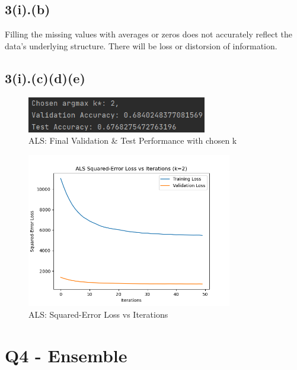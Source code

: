 \documentclass{article}
\begin{document}
\subsection*{3(i).(b)}
Filling the missing values with averages or zeros does not accurately reflect the data's underlying structure. There will be loss or distorsion of information.

\subsection*{3(i).(c)(d)(e)}
\begin{figure}[H]
    \centering
    \includegraphics[width=0.7\textwidth]{3(i)(c)(d).png}
    \caption{ALS: Final Validation \& Test Performance with chosen k\*}
\end{figure}
\begin{figure}[H]
    \centering
    \includegraphics[width=0.8\textwidth]{3(i)(e).png}
    \caption{ALS: Squared-Error Loss vs Iterations}
\end{figure}

\newpage
\section*{Q4 - Ensemble}
\end{document}
